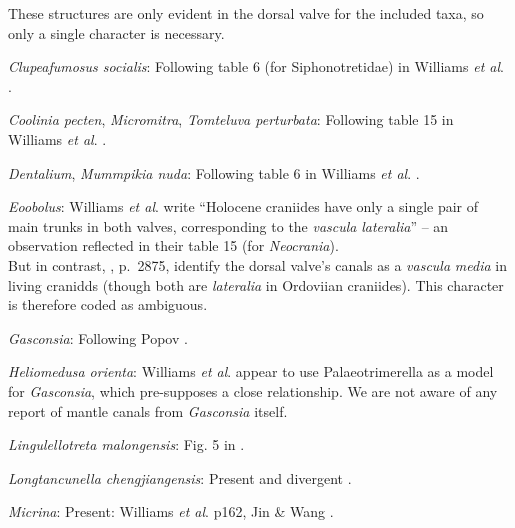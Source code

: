 \documentclass[openany]{book}
\theoremstyle{definition}
\theoremstyle{definition}
\theoremstyle{definition}
\theoremstyle{remark}
\begin{document}
These structures are only evident in the dorsal valve for the included
taxa, so only a single character is necessary.

\hypertarget{Clupeafumosus_socialis-coding-33}{}
\emph{Clupeafumosus socialis}: Following table 6 (for Siphonotretidae)
in Williams \emph{et al}.
\citeyearpar{Williams2000LinguliformeaCraniiformea}.

\hypertarget{Coolinia_pecten-coding-33}{}
\emph{Coolinia pecten}, \emph{Micromitra}, \emph{Tomteluva perturbata}:
Following table 15 in Williams \emph{et al}.
\citeyearpar{Williams2000LinguliformeaCraniiformea}.

\hypertarget{Dentalium-coding-33}{}
\emph{Dentalium}, \emph{Mummpikia nuda}: Following table 6 in Williams
\emph{et al}. \citeyearpar{Williams2000LinguliformeaCraniiformea}.

\hypertarget{Eoobolus-coding-33}{}
\emph{Eoobolus}: Williams \emph{et al}.
\citeyearpar{Williams2000LinguliformeaCraniiformea} write ``Holocene
craniides have only a single pair of main trunks in both valves,
corresponding to the \emph{vascula} \emph{lateralia}'' -- an observation
reflected in their table 15 (for \emph{Neocrania}).\\
But in contrast, \citet{Williams2007Supplement}, p.~2875, identify the
dorsal valve's canals as a \emph{vascula} \emph{media} in living
cranidds (though both are \emph{lateralia} in Ordoviian craniides). This
character is therefore coded as ambiguous.

\hypertarget{Gasconsia-coding-33}{}
\emph{Gasconsia}: Following Popov \citeyearpar[fig.
2]{Popov1992TheCambrian}.

\hypertarget{Heliomedusa_orienta-coding-33}{}
\emph{Heliomedusa orienta}: Williams \emph{et al}. \citeyearpar[table
15]{Williams2000LinguliformeaCraniiformea} appear to use
Palaeotrimerella \citep[as drawn in][]{Williams1997Introduction} as a
model for \emph{Gasconsia}, which pre-supposes a close relationship. We
are not aware of any report of mantle canals from \emph{Gasconsia}
itself.

\hypertarget{Lingulellotreta_malongensis-coding-33}{}
\emph{Lingulellotreta malongensis}: Fig. 5 in
\citet{Balthasar2009Thebrachiopod}.

\hypertarget{Longtancunella_chengjiangensis-coding-33}{}
\emph{Longtancunella chengjiangensis}: Present and divergent
\citep{Williams2000LinguliformeaCraniiformea}.

\hypertarget{Micrina-coding-33}{}
\emph{Micrina}: Present: Williams \emph{et al}.
\citeyearpar{Williams2000LinguliformeaCraniiformea} p162, Jin \& Wang
\citeyearpar{Jin1992Revisionof}.
\end{document}
